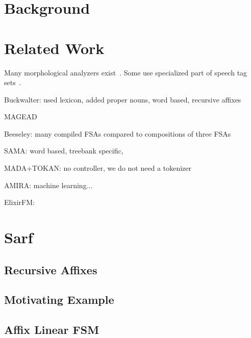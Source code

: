 \documentclass[11pt,letterpaper]{article}
\begin{document}



\section{Background}

\section{Related Work }

Many morphological analyzers exist~\cite{Sughaiyer:04}. 
Some use specialized part of speech tag sets~\cite{Khoja:01,Darwish:02}.

Buckwalter: used lexicon, added proper nouns, word based, recursive affixes

MAGEAD

Beeseley: many compiled FSAs compared to compositions of three FSAs 

SAMA: word based, treebank specific, 

MADA+TOKAN: no controller, we do not need a tokenizer

AMIRA: machine learning... 

ElixirFM: 



\section{Sarf}

\subsection{Recursive Affixes}

\subsection{Motivating Example}


\begin{figure*}[tb]
\end{figure*}

\subsection{Affix Linear FSM}
\end{document}
